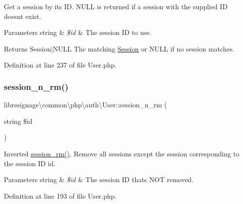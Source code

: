 Get a session by its ID. N\+U\+LL is returned if a session with the supplied ID doesn\textquotesingle{}t exist.


\begin{DoxyParams}[1]{Parameters}
string & {\em \$id} & The session ID to use.\\
\hline
\end{DoxyParams}
\begin{DoxyReturn}{Returns}
Session$\vert$\+N\+U\+LL The matching \hyperlink{classlibresignage_1_1common_1_1php_1_1auth_1_1Session}{Session} or N\+U\+LL if no session matches. 
\end{DoxyReturn}


Definition at line 237 of file User.\+php.

\mbox{\label{classlibresignage_1_1common_1_1php_1_1auth_1_1User_ab937b7fb2f9dc26bf6459cc14f2c678a}} 
\subsubsection{\texorpdfstring{session\+\_\+n\+\_\+rm()}{session\_n\_rm()}}
{\footnotesize\ttfamily libresignage\textbackslash{}common\textbackslash{}php\textbackslash{}auth\textbackslash{}\+User\+::session\+\_\+n\+\_\+rm (\begin{DoxyParamCaption}\item[{string}]{\$id }\end{DoxyParamCaption})}

\textquotesingle{}Inverted\textquotesingle{} \hyperlink{classlibresignage_1_1common_1_1php_1_1auth_1_1User_a091ceafd0b7d8a0b5c2d8fec268c49de}{session\+\_\+rm()}. Remove all sessions except the session corresponding to the session ID \textquotesingle{}id\textquotesingle{}.


\begin{DoxyParams}[1]{Parameters}
string & {\em \$id} & The session ID that\textquotesingle{}s N\+OT removed. \\
\hline
\end{DoxyParams}


Definition at line 193 of file User.\+php.

\mbox{\label{classlibresignage_1_1common_1_1php_1_1auth_1_1User_a1e1d5197720b85b2e47966fa5567d0b5}} 
